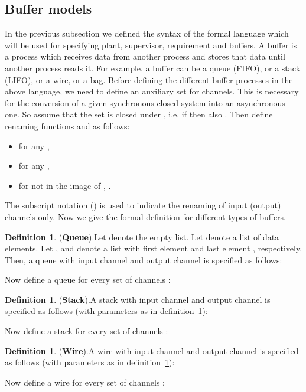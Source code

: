 \documentclass[a4paper,english,final]{article}
\theoremstyle{plain}
\theoremstyle{definition}
\newtheorem{definition}[theorem]{Definition}
\begin{document}
\subsection{Buffer models}\label{buffermodels}
In the previous subsection we defined the syntax of the formal language which will be used for specifying plant, supervisor, requirement and buffers. A buffer is a process which receives data from another process and stores that data until another process reads it. For example, a buffer can be a queue (FIFO), or a stack (LIFO), or a wire, or a bag. Before defining the different buffer processes in the above language, we need to define an auxiliary set for channels. This is necessary for the conversion of a given synchronous closed system into an asynchronous one. So assume that the set  is closed under , i.e. if  then also . Then define renaming functions  and  as follows:
\begin{itemize}
\item for any ,
\item for any ,
\item for  not in the image of , .
\end{itemize}
The subscript notation  () is used to indicate the renaming of input (output) channels only. Now we give the formal definition for different types of buffers.
\begin{definition}{(\textbf{Queue}).}\label{queuedef}
Let  denote the empty list. Let  denote a list of data elements. Let , and  denote a list with first element  and last element , respectively. Then, a queue with input channel  and output channel  is specified as follows:

Now define a queue for every set of channels :\newline

\end{definition}
\begin{definition}{(\textbf{Stack}).}\label{buffdef}
A stack with input channel  and output channel  is specified as follows (with parameters as in definition~\ref{queuedef}):

Now define a stack for every set of channels :\newline

\end{definition}
\begin{definition}{(\textbf{Wire}).}\label{buffdef}
A wire with input channel  and output channel  is specified as follows (with parameters as in definition~\ref{queuedef}):

Now define a wire for every set of channels :\newline

\end{definition}
\end{document}
